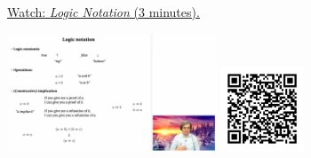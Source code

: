 
\begin{minipage}{10cm}
    \href{https://act4e-spring21.netlify.app/videos/spring2021-tradeoffs:logic-notation.html}{Watch: \emph{Logic Notation} (3 minutes).}
        
    \href{https://act4e-spring21.netlify.app/videos/spring2021-tradeoffs:logic-notation.html}{\includegraphics[height=3.5cm]{spring2021-tradeoffs:logic-notation/thumbnails.jpg}}
    \href{https://act4e-spring21.netlify.app/videos/spring2021-tradeoffs:logic-notation.html}{\includegraphics[height=2.5cm]{spring2021-tradeoffs:logic-notation/qrcode.png}}
\end{minipage}
